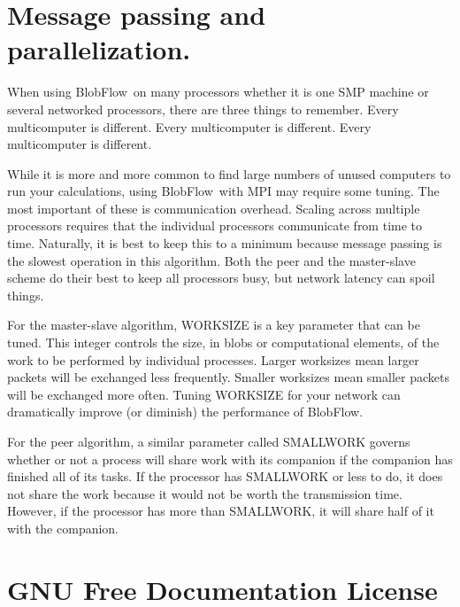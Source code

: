 \documentclass[12pt]{report}
\newcommand{\BF}{BlobFlow}
\begin{document}
\appendix

\chapter{Message passing and parallelization.}

When using \BF~on many processors whether it is one SMP machine or
several networked processors, there are three things to remember. Every
multicomputer is different. Every multicomputer is different. Every
multicomputer is different.  

While it is more and more common to find large numbers of unused computers to
run your calculations, using \BF~with MPI may require some tuning.
The most important of these is communication overhead.  Scaling across
multiple processors requires that the individual processors communicate from
time to time.  Naturally, it is best to keep this to a minimum because
message passing is the slowest operation in this algorithm.  
Both the peer and the master-slave scheme do their best to keep all
processors busy, but network latency can spoil things.

For the master-slave algorithm, WORKSIZE is a key parameter that can be
tuned.  This integer controls the size, in blobs or computational elements,
of the work to be performed by individual processes.  Larger worksizes mean
larger packets will be exchanged less frequently.  Smaller worksizes mean
smaller packets will be exchanged more often.  Tuning WORKSIZE for your
network can dramatically improve (or diminish) the performance of \BF.

For the peer algorithm, a similar parameter called SMALLWORK governs whether
or not a process will share work with its companion if the
companion has finished all of its tasks.  If the processor has SMALLWORK or
less to do, it does not share the work because it would not be worth the
transmission time.  However, if the processor has more than SMALLWORK, it
will share half of it with the companion.

\chapter{GNU Free Documentation License}
\end{document}
